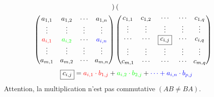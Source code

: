 \begin{definition}
\begin{enumerate}
\begin{align*}
\begin{pmatrix}
            \end{pmatrix}
            \\
            \begin{pmatrix}
                a_{1,1} & a_{1,2} & \cdots & a_{1,n} \\ 
                \vdots & \vdots & \vdots & \vdots \\
                \color{red}a_{i,1} & \color{green}a_{i,2} & \cdots & \color{blue}a_{i,n} \\ 
                \vdots & \vdots & \vdots & \vdots \\
                a_{m,1} & a_{m,2} & \cdots & a_{m,n}
            \end{pmatrix}
            &\begin{pmatrix}
                c_{1,1} & c_{1,2} & \cdots & \cdots & c_{1,q} \\
                \vdots & \vdots & \vdots & \vdots & \vdots \\
                \cdots & \cdots & \boxed{c_{i,j}} & \cdots & c_{i,q} \\
                \vdots & \vdots & \vdots & \vdots & \vdots \\
                c_{m,1} & \cdots & \cdots & \cdots & c_{m,q}
            \end{pmatrix}
        \end{align*}
        \[ \boxed{c_{i,j}} = \color{red}a_{i,1} \cdot b_{1,j} \color{black}+ \color{green} a_{i,2} \cdot b_{2,j} \color{black}+ \color{blue}\cdots + a_{i,n} \cdot b_{p,j} \]
		Attention, la multiplication n'est pas commutative $(AB \neq BA)$.
	\end{enumerate}
\end{definition}

